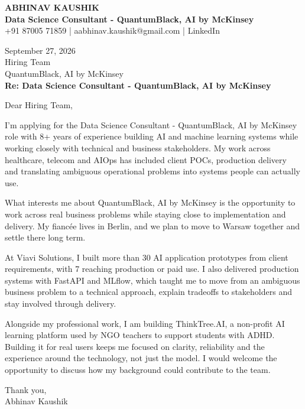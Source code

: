 \documentclass[10pt,a4paper]{article}
\begin{document}
\begin{center}
{\Large\bfseries ABHINAV KAUSHIK}\\[2pt]
{\bfseries Data Science Consultant - QuantumBlack, AI by McKinsey}\\[2pt]
+91 87005 71859 \quad | \quad aabhinav.kaushik@gmail.com \quad | \quad LinkedIn
\end{center}
\vspace{8pt}
September 27, 2026\\[6pt]
Hiring Team\\
QuantumBlack, AI by McKinsey\\[4pt]
\textbf{Re: Data Science Consultant - QuantumBlack, AI by McKinsey}

Dear Hiring Team,

I’m applying for the Data Science Consultant - QuantumBlack, AI by McKinsey role with 8+ years of experience building AI and machine learning systems while working closely with technical and business stakeholders. My work across healthcare, telecom and AIOps has included client POCs, production delivery and translating ambiguous operational problems into systems people can actually use.

What interests me about QuantumBlack, AI by McKinsey is the opportunity to work across real business problems while staying close to implementation and delivery. My fiancée lives in Berlin, and we plan to move to Warsaw together and settle there long term.

At Viavi Solutions, I built more than 30 AI application prototypes from client requirements, with 7 reaching production or paid use. I also delivered production systems with FastAPI and MLflow, which taught me to move from an ambiguous business problem to a technical approach, explain tradeoffs to stakeholders and stay involved through delivery.

Alongside my professional work, I am building ThinkTree.AI, a non-profit AI learning platform used by NGO teachers to support students with ADHD. Building it for real users keeps me focused on clarity, reliability and the experience around the technology, not just the model. I would welcome the opportunity to discuss how my background could contribute to the team.

Thank you,\\
Abhinav Kaushik
\end{document}
